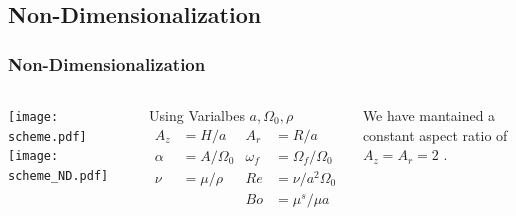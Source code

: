 \documentclass[compress]{beamer}
\begin{document}
\subsection{Non-Dimensionalization}
\begin{frame} \frametitle{Non-Dimensionalization}
\begin{columns}
\texttt{[image: scheme.pdf]}
\texttt{[image: scheme\_ND.pdf]}
\vspace{-8mm}
{\footnotesize
\begin{block}{Using Varialbes $a,\Omega_0, \rho$}
\begin{align*}
A_z &= H/a & A_r &= R/a \\
\alpha &= A/\Omega_0 & \omega_f &= \Omega_f/\Omega_0 \\
\nu &= \mu/\rho & Re &= \nu/a^2\Omega_0 \\
& & Bo &= \mu^s/\mu a \\
\end{align*}
\end{block}}
We have mantained a constant aspect ratio of $A_z = A_r = 2$ .
\end{columns}
\end{frame}
\end{document}
